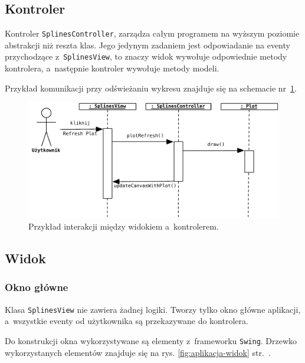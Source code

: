 \documentclass[10pt,a4paper]{article}
\newcommand{\f}[1]{\texttt{#1}}
\begin{document}
\subsection{Kontroler}

Kontroler \f{SplinesController}, zarządza całym programem na wyższym poziomie
abstrakcji niż reszta klas. Jego jedynym zadaniem jest odpowiadanie na eventy
przychodzące z~\f{SplinesView}, to znaczy widok wywołuje odpowiednie metody
kontrolera, a~następnie kontroler wywołuje metody modeli.

Przykład komunikacji przy odświeżaniu wykresu znajduje się na schemacie
nr~\ref{fig:wykres-rysuj}.

\begin{figure}[ht]
  \begin{adjustwidth}{-2cm}{-2cm}
    \centering
    \includegraphics{figury/wykres-rysuj}
    \caption{Przykład interakcji między widokiem a~kontrolerem.}
    \label{fig:wykres-rysuj}
  \end{adjustwidth}
\end{figure}

\subsection{Widok}

\subsubsection{Okno główne}

Klasa \f{SplinesView} nie zawiera żadnej logiki. Tworzy tylko okno główne
aplikacji, a~wszystkie eventy od użytkownika są przekazywane do kontrolera.

Do konstrukcji okna wykorzystywane są elementy z~frameworku \f{Swing}. Drzewko
wykorzystanych elementów znajduje się na rys. \ref{fig:aplikacja-widok}
str.~\pageref{fig:aplikacja-widok}.
\end{document}
